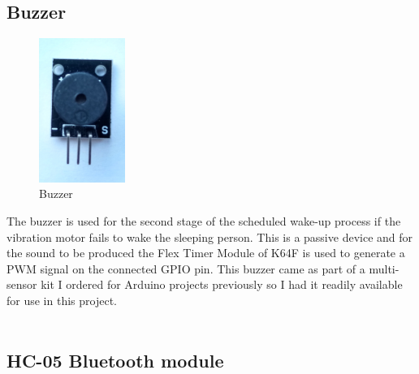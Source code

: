 \documentclass[12pt,a4paper]{article}
\begin{document}
		\subsection{Buzzer}
        \begin{figure}
         \centering
         \includegraphics[width=0.25\textwidth]{buzzer1.jpg}
         \caption{Buzzer}
        \end{figure}
		The buzzer is used for the second stage of the scheduled wake-up process if the vibration motor fails to wake the sleeping person. This is a passive device and for the sound to be produced the Flex Timer Module of K64F is used to generate a PWM signal on the connected GPIO pin. This buzzer came as part of a multi-sensor kit I ordered for Arduino projects previously so I had it readily available for use in this project.\\\\
		
		\subsection{HC-05 Bluetooth module}
		
\end{document}
